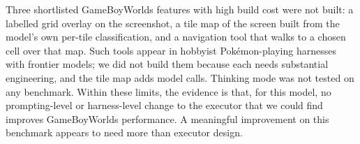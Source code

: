 Three shortlisted GameBoyWorlds features with high build cost were not built: a labelled grid overlay on the
screenshot, a tile map of the screen built from the model's own per-tile classification, and a navigation tool that
walks to a chosen cell over that map. Such tools appear in hobbyist Pok\'emon-playing harnesses with frontier models;
we did not build them because each needs substantial engineering, and the tile map adds model calls. Thinking mode was not tested on any benchmark. Within these limits,
the evidence is that, for this model, no prompting-level or harness-level change to the executor that we could find
improves GameBoyWorlds performance. A meaningful improvement on this benchmark appears to need more than executor
design.
